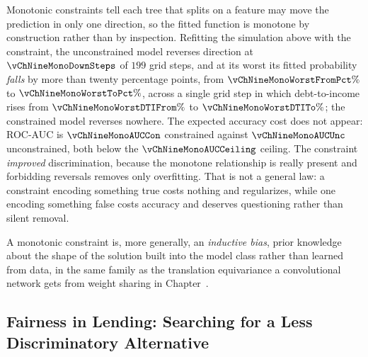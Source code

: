 \documentclass[../ai_in_finance]{subfiles}
\begin{document}
Monotonic constraints tell each tree that splits on a feature may move the prediction in only one direction, so the fitted function is monotone by construction rather than by inspection. Refitting the simulation above with the constraint, the unconstrained model reverses direction at $\vChNineMonoDownSteps$ of $199$ grid steps, and at its worst its fitted probability \emph{falls} by more than twenty percentage points, from $\vChNineMonoWorstFromPct\%$ to $\vChNineMonoWorstToPct\%$, across a single grid step in which debt-to-income rises from $\vChNineMonoWorstDTIFrom\%$ to $\vChNineMonoWorstDTITo\%$; the constrained model reverses nowhere. The expected accuracy cost does not appear: ROC-AUC is $\vChNineMonoAUCCon$ constrained against $\vChNineMonoAUCUnc$ unconstrained, both below the $\vChNineMonoAUCCeiling$ ceiling. The constraint \emph{improved} discrimination, because the monotone relationship is really present and forbidding reversals removes only overfitting. That is not a general law: a constraint encoding something true costs nothing and regularizes, while one encoding something false costs accuracy and deserves questioning rather than silent removal.

A monotonic constraint is, more generally, an \emph{inductive bias}, prior knowledge about the shape of the solution built into the model class rather than learned from data, in the same family as the translation equivariance a convolutional network gets from weight sharing in Chapter~.

\subsection{Fairness in Lending: Searching for a Less Discriminatory Alternative}
\label{sec:less-discriminatory-alternative}
\end{document}
